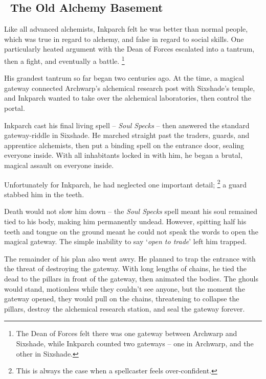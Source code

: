 \subsection[The Old Alchemy Basement]{~The Old Alchemy Basement~}
\label{old_alchemy_basement}


\begin{exampletext}
  Like all advanced alchemists, Inkparch felt he was better than normal people, which was true in regard to alchemy, and false in regard to social skills.
  One particularly heated argument with the Dean of Forces escalated into a tantrum, then a fight, and eventually a battle.%
  \footnote{The Dean of Forces felt there was one gateway between Archwarp and Sixshade, while Inkparch counted two gateways -- one in Archwarp, and the other in Sixshade.}

  His grandest tantrum so far began two centuries ago.
  At the time, a magical gateway connected Archwarp's alchemical research post with Sixshade's temple, and Inkparch wanted to take over the alchemical laboratories, then control the portal.

  Inkparch cast his final living spell -- \textit{Soul Specks} -- then answered the standard gateway-riddle in Sixshade.
  He marched straight past the traders, guards, and apprentice alchemists, then put a binding spell on the entrance door, sealing everyone inside.
  With all inhabitants locked in with him, he began a brutal, magical assault on everyone inside.

  Unfortunately for Inkparch, he had neglected one important detail;%
  \footnote{This is always the case when a spellcaster feels over-confident.}
  a guard stabbed him in the teeth.

  Death would not slow him down -- the \textit{Soul Specks} spell meant his soul remained tied to his body, making him permanently undead.
  However, spitting half his teeth and tongue on the ground meant he could not speak the words to open the magical gateway.
  The simple inability to say `\textit{open to trade}' left him trapped.

  The remainder of his plan also went awry.
  He planned to trap the entrance with the threat of destroying the gateway.
  With long lengths of chains, he tied the dead to the pillars in front of the gateway, then animated the bodies.
  The ghouls would stand, motionless while they couldn't see anyone, but the moment the gateway opened, they would pull on the chains, threatening to collapse the pillars, destroy the alchemical research station, and seal the gateway forever.


\end{exampletext}
